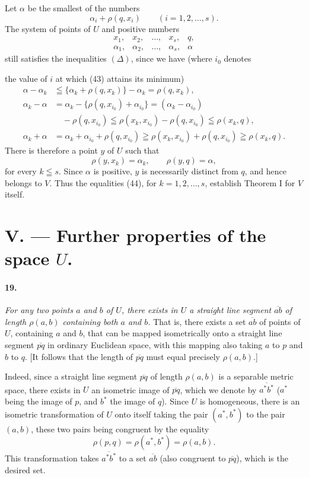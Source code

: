 \documentclass[a4paper,12pt]{amsart}
\newcommand{\srcpage}[1]{} %
\begin{document}
Let $\alpha$ be the smallest of the numbers
\begin{equation}\tag{43}
\alpha_i+\rho(q,x_i)\qquad(i=1,2,\dots,s).
\end{equation}
The system of points of $U$ and positive numbers
\[
\begin{array}{ccccc}
x_1,&x_2,&\dots,&x_s,&q,\\
\alpha_1,&\alpha_2,&\dots,&\alpha_s,&\alpha
\end{array}
\]
still satisfies the inequalities $(\Delta)$, since we have (where $i_0$ denotes
\srcpage{81}
the value of $i$ at which (43) attains its minimum)
\[
\begin{aligned}
\alpha-\alpha_k&\leqq\{\alpha_k+\rho(q,x_k)\}-\alpha_k=\rho(q,x_k),\\
\alpha_k-\alpha&=\alpha_k-\{\rho(q,x_{i_0})+\alpha_{i_0}\}=(\alpha_k-\alpha_{i_0})\\
&\quad-\rho(q,x_{i_0})\leqq\rho(x_k,x_{i_0})-\rho(q,x_{i_0})\leqq\rho(x_k,q),\\
\alpha_k+\alpha&=\alpha_k+\alpha_{i_0}+\rho(q,x_{i_0})\geqq\rho(x_k,x_{i_0})+\rho(q,x_{i_0})\geqq\rho(x_k,q).
\end{aligned}
\]
There is therefore a point $y$ of $U$ such that
\begin{equation}\tag{44}
\rho(y,x_k)=\alpha_k,\qquad\rho(y,q)=\alpha,
\end{equation}
for every $k\leqq s$. Since $\alpha$ is positive, $y$ is necessarily distinct from $q$, and hence belongs to $V$. Thus the equalities (44), for $k=1,2,\dots,s$, establish Theorem I for $V$ itself.

\section*{V. --- Further properties of the space $U$.}
\paragraph{19.}
\textit{For any two points $a$ and $b$ of $U$, there exists in $U$ a straight line segment $\overline{ab}$ of length $\rho(a,b)$ containing both $a$ and $b$.} That is, there exists a set $\overline{ab}$ of points of $U$, containing $a$ and $b$, that can be mapped isometrically onto a straight line segment $\overline{pq}$ in ordinary Euclidean space, with this mapping also taking $a$ to $p$ and $b$ to $q$. [It follows that the length of $\overline{pq}$ must equal precisely $\rho(a,b)$.]

Indeed, since a straight line segment $\overline{pq}$ of length $\rho(a,b)$ is a separable metric space, there exists in $U$ an isometric image of $\overline{pq}$, which we denote by $\overline{a^*b^*}$ ($a^*$ being the image of $p$, and $b^*$ the image of $q$). Since $U$ is homogeneous, there is an isometric transformation of $U$ onto itself taking the pair $(a^*,b^*)$ to the pair $(a,b)$, these two pairs being congruent by the equality
\[
\rho(p,q)=\rho(a^*,b^*)=\rho(a,b).
\]
This transformation takes $\overline{a^*b^*}$ to a set $\overline{ab}$ (also congruent to $\overline{pq}$), which is the desired set.
\end{document}
